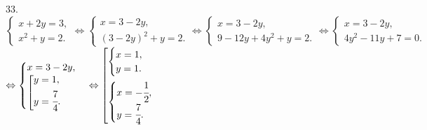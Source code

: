 33. $\begin{cases}
x+2y=3,\\
x^2+y=2.\end{cases}\Leftrightarrow\begin{cases}
x=3-2y,\\
(3-2y)^2+y=2.\end{cases}\Leftrightarrow\begin{cases}
x=3-2y,\\
9-12y+4y^2+y=2.\end{cases}\Leftrightarrow\begin{cases}
x=3-2y,\\
4y^2-11y+7=0.\end{cases}$\\$\Leftrightarrow\begin{cases}
x=3-2y,\\
\left[
      \begin{gathered} y=1,\hfill\\
      y=\cfrac{7}{4}.\hfill \end{gathered}\right.\end{cases}\Leftrightarrow
\left[
      \begin{gathered} \begin{cases}x=1,\\y=1.\end{cases}\hfill\\
      \begin{cases}x=-\cfrac{1}{2},\\y=\cfrac{7}{4}.\end{cases}\hfill \end{gathered}\right.$\\
